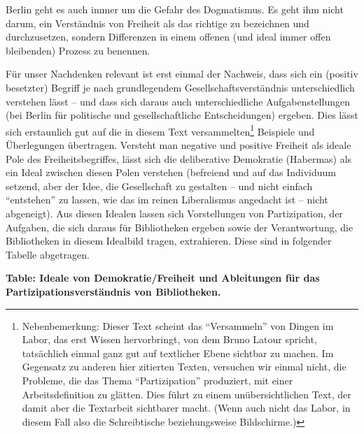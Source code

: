 \documentclass[a4paper,
fontsize=11pt,
oneside,
numbers=noperiodatend,
parskip=half-,
bibliography=totoc,
final
]{scrartcl}
\begin{document}
Berlin geht es auch immer um die Gefahr des Dogmatismus. Es geht ihm
nicht darum, ein Verständnis von Freiheit als das richtige zu bezeichnen
und durchzusetzen, sondern Differenzen in einem offenen (und ideal immer
offen bleibenden) Prozess zu benennen.

Für unser Nachdenken relevant ist erst einmal der Nachweis, dass sich
ein (positiv besetzter) Begriff je nach grundlegendem
Gesellschaftsverständnis unterschiedlich verstehen lässt -- und dass
sich daraus auch unterschiedliche Aufgabenstellungen (bei Berlin für
politische und gesellschaftliche Entscheidungen) ergeben. Dies lässt
sich erstaunlich gut auf die in diesem Text versammelten\footnote{Nebenbemerkung:
  Dieser Text scheint das \enquote{Versammeln} von Dingen im Labor, das
  erst Wissen hervorbringt, von dem Bruno Latour spricht, tatsächlich
  einmal ganz gut auf textlicher Ebene sichtbar zu machen. Im Gegensatz
  zu anderen hier zitierten Texten, versuchen wir einmal nicht, die
  Probleme, die das Thema \enquote{Partizipation} produziert, mit einer
  Arbeitsdefinition zu glätten. Dies führt zu einem unübersichtlichen
  Text, der damit aber die Textarbeit sichtbarer macht. (Wenn auch nicht
  das Labor, in diesem Fall also die Schreibtische beziehungsweise
  Bildschirme.)} Beispiele und Überlegungen übertragen. Versteht man
negative und positive Freiheit als ideale Pole des Freiheitsbegriffes,
lässt sich die deliberative Demokratie (Habermas) als ein Ideal zwischen
diesen Polen verstehen (befreiend und auf das Individuum setzend, aber
der Idee, die Gesellschaft zu gestalten -- und nicht einfach
\enquote{entstehen} zu lassen, wie das im reinen Liberalismus angedacht
ist -- nicht abgeneigt). Aus diesen Idealen lassen sich Vorstellungen
von Partizipation, der Aufgaben, die sich daraus für Bibliotheken
ergeben sowie der Verantwortung, die Bibliotheken in diesem Idealbild
tragen, extrahieren. Diese sind in folgender Tabelle abgetragen.

\textbf{Table: Ideale von Demokratie/Freiheit und Ableitungen für das
Partizipationsverständnis von Bibliotheken.}
\end{document}
